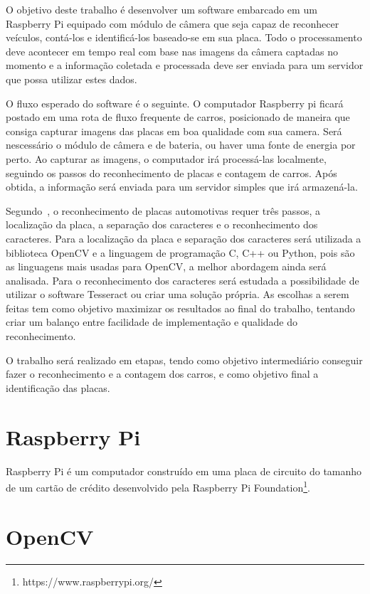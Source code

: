 
O objetivo deste trabalho é desenvolver um software embarcado em um Raspberry Pi
equipado com módulo de câmera que seja capaz de reconhecer veículos, contá-los e
identificá-los baseado-se em sua placa. Todo o processamento deve acontecer em
tempo real com base nas imagens da câmera captadas no momento e a informação
coletada e processada deve ser enviada para um servidor que possa utilizar estes
dados.

O fluxo esperado do software é o seguinte. O computador Raspberry pi ficará postado
em uma rota de fluxo frequente de carros, posicionado de maneira que consiga capturar
imagens das placas em boa qualidade com sua camera. Será nescessário o módulo de câmera
e de bateria, ou haver uma fonte de energia por perto. Ao capturar as imagens, o computador
irá processá-las localmente, seguindo os passos do reconhecimento de placas e contagem de carros.
Após obtida, a informação será enviada para um servidor simples que irá armazená-la.

Segundo~\cite{ahmad2015automatic}, o reconhecimento de placas automotivas requer
três passos, a localização da placa, a separação dos caracteres e o
reconhecimento dos caracteres. Para a localização da placa e separação dos
caracteres será utilizada a biblioteca OpenCV e a linguagem de programação C,
C++ ou Python, pois são as linguagens mais usadas para OpenCV, a melhor
abordagem ainda será analisada. Para o reconhecimento dos caracteres será
estudada a possibilidade de utilizar o software Tesseract ou criar uma solução
própria. As escolhas a serem feitas tem como objetivo maximizar os resultados ao
final do trabalho, tentando criar um balanço entre facilidade de implementação e
qualidade do reconhecimento.

O trabalho será realizado em etapas, tendo como objetivo intermediário conseguir
fazer o reconhecimento e a contagem dos carros, e como objetivo final a
identificação das placas.

\section{Raspberry Pi}
\label{sec:raspi}

Raspberry Pi é um computador construído em uma placa de circuito do tamanho de
um cartão de crédito desenvolvido pela Raspberry Pi
Foundation\footnote{https://www.raspberrypi.org/}.

\section{OpenCV}
\label{sec:opencv}

